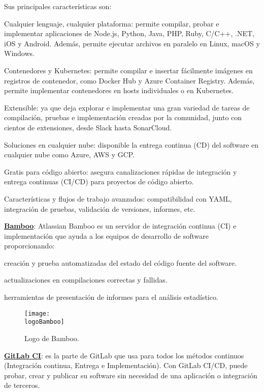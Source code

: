 \begin{compactitem}
    Sus principales características son:
    \begin{compactitem}
        \item Cualquier lenguaje, cualquier plataforma: permite compilar, probar e implementar aplicaciones de Node.js, Python, Java, PHP, Ruby, C/C++, .NET, iOS y Android. Además, permite ejecutar archivos en paralelo en Linux, macOS y Windows.
        \item Contenedores y Kubernetes: permite compilar e insertar fácilmente imágenes en registros de contenedor, como Docker Hub y Azure Container Registry. Además, permite implementar contenedores en hosts individuales o en Kubernetes.
        \item Extensible: ya que deja explorar e implementar una gran variedad de tareas de compilación, pruebas e implementación creadas por la comunidad, junto con cientos de extensiones, desde Slack hasta SonarCloud.
        \item Soluciones en cualquier nube: disponible la entrega continua (CD) del software en cualquier nube como Azure, AWS y GCP.
        \item Gratis para código abierto: asegura canalizaciones rápidas de integración y entrega continuas (CI/CD) para proyectos de código abierto.
        \item Características y flujos de trabajo avanzados: compatibilidad con YAML, integración de pruebas, validación de versiones, informes, etc.
    \end{compactitem}
    \item \textbf{\underline{Bamboo}}: Atlassian Bamboo es un servidor de integración continua (CI) e implementación que ayuda a los equipos de desarrollo de software proporcionando:
    \begin{compactitem}
        \item creación y prueba automatizadas del estado del código fuente del software.
        \item actualizaciones en compilaciones correctas y fallidas.
        \item herramientas de presentación de informes para el análisis estadístico.
    \end{compactitem}
    \begin{figure}[h]
        \centering
        \texttt{[image: \\logoBamboo]}
        \caption{Logo de Bamboo.}
    \end{figure}
    \item \textbf{\underline{GitLab CI}}: es la parte de GitLab que usa para todos los métodos continuos (Integración continua, Entrega e Implementación). Con GitLab CI/CD, puede probar, crear y publicar su software sin necesidad de una aplicación o integración de terceros.

\end{compactitem}
